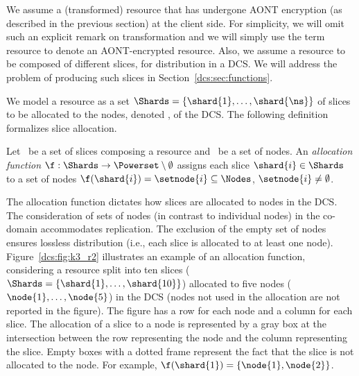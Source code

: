 We assume a (transformed) resource that has undergone AONT encryption
(as described in the previous section) at the client side. For
simplicity, we will omit such an explicit remark on transformation and
we will simply use the term resource to denote an AONT-encrypted
resource.  Also, we assume a resource to be composed of different
slices, for distribution in a DCS. We will address the problem of
producing such slices in Section~\ref{dcs:sec:functions}.

We model a resource as a set
$\Shards=\{\shard{1},\ldots,\shard{\ns}\}$ of slices to be allocated
to the nodes, denoted \Nodes, of the DCS.  The following definition
formalizes slice allocation.

\smallskip
\begin{definition}
Let \Shards\ be a set of slices composing a resource and \Nodes\ be a
set of nodes. An {\em allocation function\/} $\f : \Shards \rightarrow
\Powerset \setminus \emptyset$ assigns each slice $\shard{i} \in
\Shards$ to a set of nodes $\f(\shard{i})=\setnode{i} \subseteq
\Nodes$, $\setnode{i} \neq \emptyset$.
\end{definition}
\smallskip

The allocation function dictates how slices are allocated to nodes in
the DCS. The consideration of sets of nodes (in contrast to individual
nodes) in the co-domain accommodates replication. The exclusion of the
empty set of nodes ensures lossless distribution (i.e., each slice is
allocated to at least one node).  Figure~\ref{dcs:fig:k3_r2} illustrates
an example of an allocation function, considering a resource split
into ten slices ($\Shards=\{\shard{1},\ldots,\shard{10}\}$) allocated
to five nodes ($\node{1},\ldots,\node{5}$) in the DCS (nodes not used
in the allocation are not reported in the figure).  The figure has a
row for each node and a column for each slice. The allocation of a
slice to a node is represented by a gray box at the intersection
between the row representing the node and the column representing the
slice. Empty boxes with a dotted frame represent the fact that the
slice is not allocated to the node.  For example,
$\f(\shard{1})=\{\node{1},\node{2}\}$.


